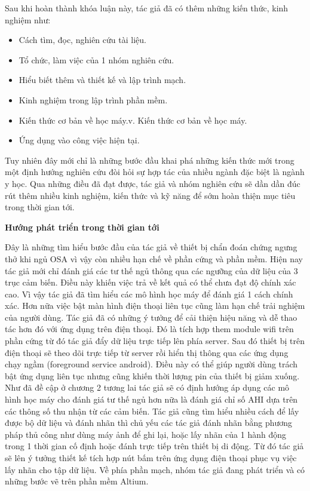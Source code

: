 Sau khi hoàn thành khóa luận này, tác giả đã có thêm những kiến thức, kinh nghiệm như:
\begin{itemize}
    \item Cách tìm, đọc, nghiên cứu tài liệu.
    
    \item Tổ chức, làm việc của 1 nhóm nghiên cứu.
    \item Hiểu biết thêm và thiết kế và lập trình mạch.

    \item Kinh nghiệm trong lập trình phần mềm.
    \item Kiến thức cơ bản về học máy.v.	Kiến thức cơ bản về học máy.
    \item Ứng dụng vào công việc hiện tại.
\end{itemize}
Tuy nhiên đây mới chỉ là những bước đầu khai phá những kiến thức mới trong một định hướng nghiên cứu đòi hỏi sự hợp tác của nhiều ngành đặc biệt là ngành y học. Qua những điều đã đạt được, tác giả và nhóm nghiên cứu sẽ dần dần đúc rút thêm nhiều kinh nghiệm, kiến thức và kỹ năng để sớm hoàn thiện mục tiêu trong thời gian tới.

\textbf{Hướng phát triển trong thời gian tới}

Đây là những tìm hiểu bước đầu của tác giả về thiết bị chẩn đoán chứng ngưng thở khi ngủ OSA vì vậy còn nhiều hạn chế về phần cứng và phần mềm. Hiện nay tác giả mới chỉ đánh giá các tư thế ngủ thông qua các ngưỡng của dữ liệu của 3 trục cảm biến. Điều này khiến việc trả về kết quả có thể chưa đạt độ chính xác cao. Vì vậy tác giả đã tìm hiểu các mô hình học máy để đánh giá 1 cách chính xác. Hơn nữa việc bật màn hình điện thoại liên tục cũng làm hạn chế trải nghiệm của người dùng. Tác giả đã có những ý tưởng để cải thiện hiệu năng và dễ thao tác hơn đó với ứng dụng trên điện thoại. Đó là tích hợp them module wifi trên phần cứng từ đó tác giả đẩy dữ liệu trực tiếp lên phía server. Sau đó thiết bị trên điện thoại sẽ theo dõi trực tiếp từ server rồi hiển thị thông qua các ứng dụng chạy ngầm (foreground service android). Điều này có thể giúp người dùng trách bật ứng dụng liên tục nhưng cũng khiến thời lượng pin của thiết bị giảm xuống.
Như đã đề cập ở chương 2 tương lai tác giả sẽ có định hướng áp dụng các mô hình học máy cho đánh giá tư thế ngủ hơn nữa là đánh giá chỉ số AHI dựa trên các thông số thu nhận từ các cảm biến. Tác giả cũng tìm hiểu nhiều cách để lấy được bộ dữ liệu và đánh nhãn thì chủ yếu các tác giả đánh nhãn bằng phương pháp thủ công như dùng máy ảnh để ghi lại, hoặc lấy nhãn của 1 hành động trong 1 thời gian cố định hoặc đánh trực tiếp trên thiết bị di động. Từ đó tác giả sẽ lên ý tưởng thiết kế tích hợp nút bấm trên ứng dụng điện thoại phục vụ việc lấy nhãn cho tập dữ liệu.
Về phía phần mạch, nhóm tác giả đang phát triển và có những bước vẽ trên phần mềm Altium.

